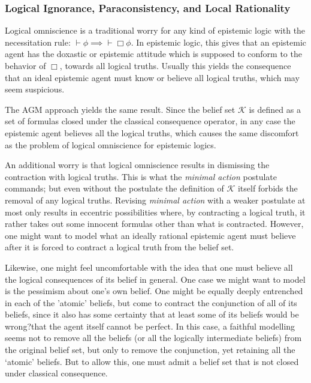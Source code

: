 \documentclass[12pt]{article}
\newcommand{\K}{\mathcal{K}}
\begin{document}
\subsubsection{Logical Ignorance, Paraconsistency, and Local Rationality}
Logical omniscience is a traditional worry for any kind of epistemic logic with the necessitation rule: $\vdash \phi \implies \vdash \Box \phi$. In epistemic logic, this gives that an epistemic agent has the doxastic or epistemic attitude which is supposed to conform to the behavior of $\Box$, towards all logical truths. Usually this yields the consequence that an ideal epistemic agent must know or believe all logical truths, which may seem suspicious. 
\par
The AGM approach yields the same result. Since the belief set $\K$ is defined as a set of formulas closed under the classical consequence operator, in any case the epistemic agent believes all the logical truths, which causes the same discomfort as the problem of logical omniscience for epistemic logics. 
\par
An additional worry is that logical omniscience results in dismissing the contraction with logical truths. This is what the \textit{minimal action} postulate commands; but even without the postulate the definition of $\K$ itself forbids the removal of any logical truths. Revising \textit{minimal action} with a weaker postulate at most only results in eccentric possibilities where, by contracting a logical truth, it rather takes out some innocent formulas other than what is contracted. However, one might want to model what an ideally rational epistemic agent must believe after it is forced to contract a logical truth from the belief set. 
\par
Likewise, one might feel uncomfortable with the idea that one must believe all the logical consequences of its belief in general. One case we might want to model is the pessimism about one's own belief. One might be equally deeply entrenched in each of the 'atomic' beliefs, but come to contract the conjunction of all of its beliefs, since it also has some certainty that at least some of its beliefs would be wrong?that the agent itself cannot be perfect. In this case, a faithful modelling seems not to remove all the beliefs (or all the logically intermediate beliefs) from the original belief set, but only to remove the conjunction, yet retaining all the `atomic' beliefs. But to allow this, one must admit a belief set that is not closed under classical consequence. 
\par
\end{document}
